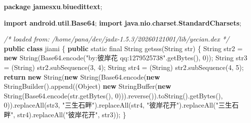 \documentclass[
]{article}
\newenvironment{Shaded}{}{}
\newcommand{\BuiltInTok}[1]{\textcolor[rgb]{0.00,0.50,0.00}{#1}}
\newcommand{\CommentTok}[1]{\textcolor[rgb]{0.38,0.63,0.69}{\textit{#1}}}
\newcommand{\ControlFlowTok}[1]{\textcolor[rgb]{0.00,0.44,0.13}{\textbf{#1}}}
\newcommand{\DataTypeTok}[1]{\textcolor[rgb]{0.56,0.13,0.00}{#1}}
\newcommand{\DecValTok}[1]{\textcolor[rgb]{0.25,0.63,0.44}{#1}}
\newcommand{\FunctionTok}[1]{\textcolor[rgb]{0.02,0.16,0.49}{#1}}
\newcommand{\ImportTok}[1]{\textcolor[rgb]{0.00,0.50,0.00}{\textbf{#1}}}
\newcommand{\KeywordTok}[1]{\textcolor[rgb]{0.00,0.44,0.13}{\textbf{#1}}}
\newcommand{\NormalTok}[1]{#1}
\newcommand{\OperatorTok}[1]{\textcolor[rgb]{0.40,0.40,0.40}{#1}}
\newcommand{\StringTok}[1]{\textcolor[rgb]{0.25,0.44,0.63}{#1}}
\begin{document}
\begin{Shaded}
\begin{Highlighting}[]
\KeywordTok{package}\ImportTok{ jamesxu}\OperatorTok{.}\ImportTok{biuedittext}\OperatorTok{;}

\KeywordTok{import} \ImportTok{android}\OperatorTok{.}\ImportTok{util}\OperatorTok{.}\ImportTok{Base64}\OperatorTok{;}
\KeywordTok{import} \ImportTok{java}\OperatorTok{.}\ImportTok{nio}\OperatorTok{.}\ImportTok{charset}\OperatorTok{.}\ImportTok{StandardCharsets}\OperatorTok{;}

\CommentTok{/* loaded from: /home/pana/dev/jadx{-}1.5.3/20260121001/lib/yecian.dex */}
\KeywordTok{public} \KeywordTok{class}\NormalTok{ jiami }\OperatorTok{\{}
    \KeywordTok{public} \DataTypeTok{static} \DataTypeTok{final} \BuiltInTok{String} \FunctionTok{getsss}\OperatorTok{(}\BuiltInTok{String}\NormalTok{ str}\OperatorTok{)} \OperatorTok{\{}
        \BuiltInTok{String}\NormalTok{ str2 }\OperatorTok{=} \KeywordTok{new} \BuiltInTok{String}\OperatorTok{(}\NormalTok{Base64}\OperatorTok{.}\FunctionTok{encode}\OperatorTok{(}\StringTok{"by:彼岸花 qq:1279525738"}\OperatorTok{.}\FunctionTok{getBytes}\OperatorTok{(),} \DecValTok{0}\OperatorTok{));}
        \BuiltInTok{String}\NormalTok{ str3 }\OperatorTok{=} \OperatorTok{(}\BuiltInTok{String}\OperatorTok{)}\NormalTok{ str2}\OperatorTok{.}\FunctionTok{subSequence}\OperatorTok{(}\DecValTok{3}\OperatorTok{,} \DecValTok{4}\OperatorTok{);}
        \BuiltInTok{String}\NormalTok{ str4 }\OperatorTok{=} \OperatorTok{(}\BuiltInTok{String}\OperatorTok{)}\NormalTok{ str2}\OperatorTok{.}\FunctionTok{subSequence}\OperatorTok{(}\DecValTok{4}\OperatorTok{,} \DecValTok{5}\OperatorTok{);}
        \ControlFlowTok{return} \KeywordTok{new} \BuiltInTok{String}\OperatorTok{(}\KeywordTok{new} \BuiltInTok{String}\OperatorTok{(}\NormalTok{Base64}\OperatorTok{.}\FunctionTok{encode}\OperatorTok{(}\KeywordTok{new} \BuiltInTok{StringBuilder}\OperatorTok{().}\FunctionTok{append}\OperatorTok{((}\BuiltInTok{Object}\OperatorTok{)} \KeywordTok{new} \BuiltInTok{StringBuffer}\OperatorTok{(}\KeywordTok{new} \BuiltInTok{String}\OperatorTok{(}\NormalTok{Base64}\OperatorTok{.}\FunctionTok{encode}\OperatorTok{(}\NormalTok{str}\OperatorTok{.}\FunctionTok{getBytes}\OperatorTok{(),} \DecValTok{0}\OperatorTok{))).}\FunctionTok{reverse}\OperatorTok{()).}\FunctionTok{toString}\OperatorTok{().}\FunctionTok{getBytes}\OperatorTok{(),} \DecValTok{0}\OperatorTok{)).}\FunctionTok{replaceAll}\OperatorTok{(}\NormalTok{str3}\OperatorTok{,} \StringTok{"三生石畔"}\OperatorTok{).}\FunctionTok{replaceAll}\OperatorTok{(}\NormalTok{str4}\OperatorTok{,} \StringTok{"彼岸花开"}\OperatorTok{).}\FunctionTok{replaceAll}\OperatorTok{(}\StringTok{"三生石畔"}\OperatorTok{,}\NormalTok{ str4}\OperatorTok{).}\FunctionTok{replaceAll}\OperatorTok{(}\StringTok{"彼岸花开"}\OperatorTok{,}\NormalTok{ str3}\OperatorTok{));}
    \OperatorTok{\}}


\end{Highlighting}
\end{Shaded}
\end{document}
